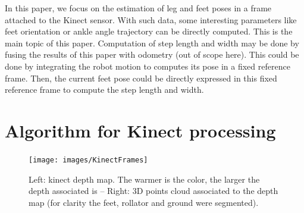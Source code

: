 \documentclass[letterpaper, 10 pt, conference]{ieeeconf}
\newcommand{\CDOK}[2]{{#1}} %
\begin{document}
In this paper, we focus on the estimation of leg and feet poses in a frame attached to the Kinect sensor. With such data, some interesting parameters like feet orientation or ankle angle trajectory can be directly computed. This is the main topic of this paper. Computation of step length and width may be done by fusing the results of this paper with odometry (out of scope here). \CDOK{This could be done by integrating the robot motion to computes its pose in a fixed reference frame. Then, the current feet pose could be directly expressed in this fixed reference frame to compute the step length and width.}{}



\section{Algorithm for Kinect processing}
\label{sec:Algorithm}

\begin{figure}
	\centering
	\texttt{[image: images/KinectFrames]}
	\caption{Left: kinect depth map. The warmer is the color, the larger the depth associated is -- Right: 3D points cloud associated to the depth map (for clarity the feet, rollator and ground were segmented).}
	\label{fig:KinectFrames}
\end{figure}
\end{document}
